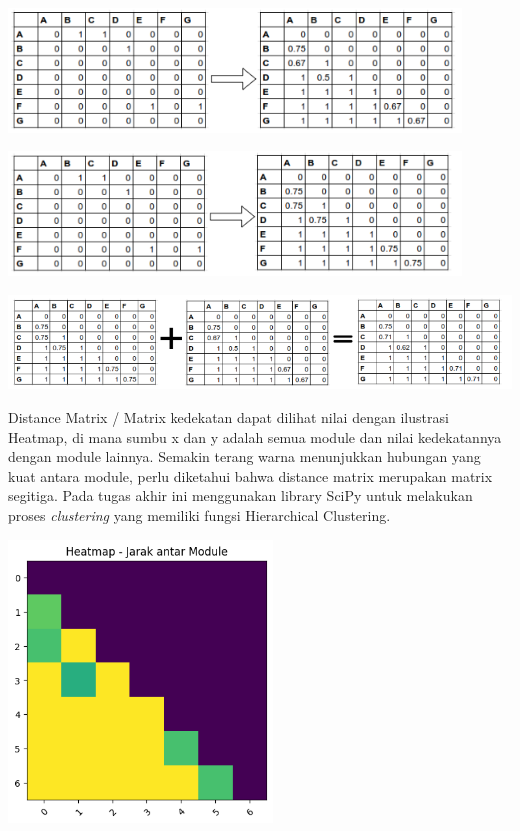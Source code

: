\begin{center}
	\includegraphics[width=12cm]{img/bab_3/simJaccard.png}
	\label{fig:asd}
\end{center}
\begin{center}
	\includegraphics[width=12cm]{img/bab_3/simStr.png}
	\label{fig:asd}
\end{center}

\begin{center}
	\includegraphics[width=14cm]{img/bab_3/hasilJarak.png}
	\label{fig:asd}
\end{center}
Distance Matrix / Matrix kedekatan dapat dilihat nilai dengan ilustrasi Heatmap, di mana sumbu x dan y adalah semua module dan nilai kedekatannya dengan module lainnya. Semakin terang warna menunjukkan hubungan yang kuat antara module, perlu diketahui bahwa distance matrix merupakan matrix segitiga. Pada tugas akhir ini menggunakan library SciPy untuk melakukan proses \textit{clustering} yang memiliki fungsi Hierarchical Clustering.

\begin{center}
	\includegraphics[width=7cm]{img/bab_3/heatmap.png}
	\label{fig:asd}
\end{center}

